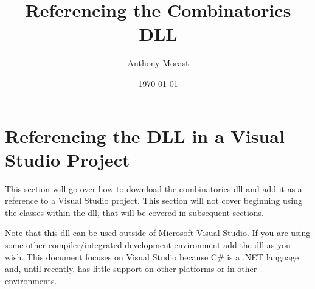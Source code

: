 \documentclass {article}
\title {Referencing the Combinatorics DLL}
\author {Anthony Morast}
\date {\today}
\begin{document}
\maketitle

\section {Referencing the DLL in a Visual Studio Project}
This section will go over how to download the combinatorics dll and add it as a reference to a Visual Studio project. This section will not cover beginning using the classes within the dll, that
will be covered in subsequent sections. \\

\vspace{5mm}

Note that this dll can be used outside of Microsoft Visual Studio. If you are using some other compiler/integrated development environment add the dll as you wish. This document focuses on Visual Studio because C\# is a .NET language and, until recently, has little support on other platforms or in other environments. \\

\vspace{5mm}
\end{document}
